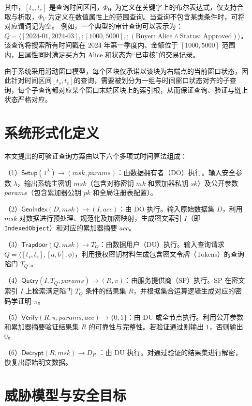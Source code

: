 其中，$[t_s, t_e]$ 是查询时间区间，$\Phi_{W}$ 为定义在关键字上的布尔表达式，仅支持合取与析取，$\Phi_{V}$ 为定义在数值属性上的范围查询。当查询不包含某类条件时，可将对应谓词记为空。
例如，一个典型的审计查询可以表示为：$Q = \langle [2024\text{-}01, 2024\text{-}03],; [1000, 5000],; (\text{Buyer: Alice} \wedge \text{Status: Approved}) \rangle$。该查询将搜索所有时间戳在 2024 年第一季度内、金额位于 $[1000, 5000]$ 范围内，且属性同时满足买方为 Alice 和状态为“已审核”的交易记录。

由于系统采用滑动窗口模型，每个区块仅承诺以该块为右端点的当前窗口状态，因此针对时间区间$[t_s,t_e]$的查询，需要被划分为一组与时间窗口状态对齐的子查询，每个子查询都对应某个窗口末端区块上的索引根，从而保证查询、验证与链上状态严格对应。

\section{系统形式化定义}
本文提出的可验证查询方案由以下六个多项式时间算法组成：

（1）\quad $\textsf{Setup}(1^\lambda) \to (msk, params)$：由数据拥有者（DO）执行。输入安全参数 $\lambda$，输出系统主密钥 $msk$（包含对称密钥 $mk$ 和累加器私钥 $sk$）及公开参数 $params$（包含累加器公钥 $pk$ 和全局注册表配置）。

（2）\quad $\textsf{GenIndex}(D, msk) \to (I, acc)$：由 DO 执行。输入原始数据集 $D$，利用 $msk$ 对数据进行预处理、规范化及加密映射，生成密文索引 $I$（即 \texttt{IndexedObject}）和对应的累加器摘要 $acc$。

（3）\quad $\textsf{Trapdoor}(Q, msk) \to T_Q$：由数据用户（DU）执行。输入查询请求 $Q = \langle [t_s, t_e], [a, b], \phi \rangle$，利用授权密钥材料生成包含密文令牌（Tokens）的查询陷门 $T_Q$ 。

（4）\quad $\textsf{Query}(I, T_Q, params) \to (R, \pi)$：由服务提供商（SP）执行。SP 在密文索引 $I$ 上检索满足陷门 $T_Q$ 条件的结果集 $R$，并根据集合运算逻辑生成对应的密码学证明 $\pi$。

（5）\quad $\textsf{Verify}(R, \pi, params, acc) \to \{0, 1\}$：由 DU 或全节点执行。利用公开参数和累加器摘要验证结果集 $R$ 的可靠性与完整性。若验证通过则输出 $1$，否则输出 $0$。

（6）\quad $\textsf{Decrypt}(R, msk) \to D_R$ ：由 DU 执行。对通过验证的结果集进行解密，恢复出原始明文数据。

\section{威胁模型与安全目标}


